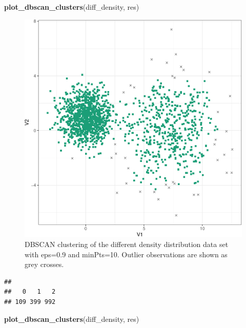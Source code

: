 \documentclass[]{book}
\newenvironment{Shaded}{\begin{snugshade}}{\end{snugshade}}
\newcommand{\KeywordTok}[1]{\textcolor[rgb]{0.13,0.29,0.53}{\textbf{{#1}}}}
\newcommand{\DataTypeTok}[1]{\textcolor[rgb]{0.13,0.29,0.53}{{#1}}}
\newcommand{\DecValTok}[1]{\textcolor[rgb]{0.00,0.00,0.81}{{#1}}}
\newcommand{\FloatTok}[1]{\textcolor[rgb]{0.00,0.00,0.81}{{#1}}}
\newcommand{\StringTok}[1]{\textcolor[rgb]{0.31,0.60,0.02}{{#1}}}
\newcommand{\NormalTok}[1]{{#1}}
\theoremstyle{definition}
\theoremstyle{definition}
\theoremstyle{definition}
\theoremstyle{remark}
\begin{document}
\begin{Shaded}
\begin{Highlighting}[]
\KeywordTok{plot_dbscan_clusters}\NormalTok{(diff_density, res)}
\end{Highlighting}
\end{Shaded}

\begin{figure}

{\centering \includegraphics[width=0.6\linewidth]{09-clustering_files/figure-latex/diffDensityDBSCANscatter1-1} 

}

\caption{DBSCAN clustering of the different density distribution data set with eps=0.9 and minPts=10. Outlier observations are shown as grey crosses.}\label{fig:diffDensityDBSCANscatter1}
\end{figure}

\begin{Shaded}
\end{Shaded}

\begin{verbatim}
## 
##   0   1   2 
## 109 399 992
\end{verbatim}

\begin{Shaded}
\begin{Highlighting}[]
\KeywordTok{plot_dbscan_clusters}\NormalTok{(diff_density, res)}
\end{Highlighting}
\end{Shaded}
\end{document}

